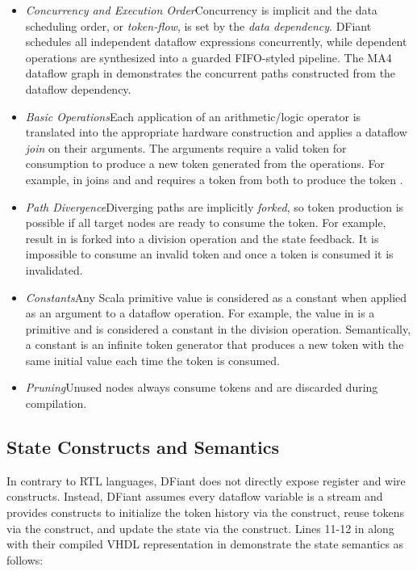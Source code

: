 \begin{itemize}[leftmargin=*]
	\item \textit{Concurrency and Execution Order}\quad Concurrency is implicit and the data scheduling order, or \textit{token-flow}, is set by the \textit{data dependency}. DFiant schedules all independent dataflow expressions concurrently, while dependent operations are synthesized into a guarded FIFO-styled pipeline. The MA4 dataflow graph in  demonstrates the concurrent paths constructed from the dataflow dependency. 
	\item \textit{Basic Operations}\quad Each application of an arithmetic/logic operator is translated into the appropriate hardware construction and applies a dataflow \emph{join} on their arguments. The arguments require a valid token for consumption to produce a new token generated from the operations. For example, \code{+} in  joins  and  and requires a token from both to produce the token .
	\item \textit{Path Divergence}\quad Diverging paths are implicitly \emph{forked}, so token production is possible if all target nodes are ready to consume the token. For example,  result in  is forked into a division operation and the state feedback.	It is impossible to consume an invalid token and once a token is consumed it is invalidated.
	\item \textit{Constants}\quad Any Scala primitive value is considered as a constant when applied as an argument to a dataflow operation. For example, the value  in  is a primitive  and is considered a constant in the division operation. Semantically, a constant is an infinite token generator that produces a new token with the same initial value each time the token is consumed.
	\item \textit{Pruning}\quad Unused nodes always consume tokens and are discarded during compilation. 
\end{itemize} 



\subsection{State Constructs and Semantics}
\label{sec:state_constructs}
In contrary to RTL languages, DFiant does not directly expose register and wire constructs. Instead, DFiant assumes every dataflow variable is a stream and provides constructs to initialize the token history via the  construct, reuse tokens via the  construct, and update the state via the \code{:=} construct. Lines 11-12 in  along with their compiled VHDL representation in  demonstrate the state semantics as follows:

